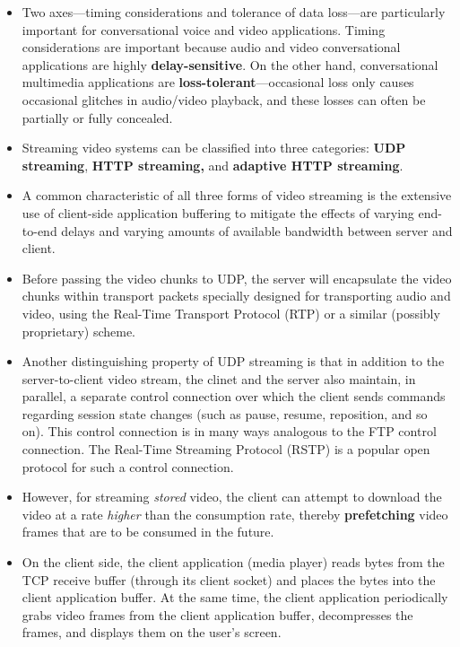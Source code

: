 \begin{itemize}
\item
Two axes---timing considerations and tolerance of data loss---are particularly important for conversational voice and video applications. Timing considerations are important because audio and video conversational applications are highly \textbf{delay-sensitive}. On the other hand, conversational multimedia applications are \textbf{loss-tolerant}---occasional loss only causes occasional glitches in audio/video playback, and these losses can often be partially or fully concealed.

\item
Streaming video systems can be classified into three categories: \textbf{UDP streaming}, \textbf{HTTP streaming,} and \textbf{adaptive HTTP streaming}.

\item
A common characteristic of all three forms of video streaming is the extensive use of client-side application buffering to mitigate the effects of varying end-to-end delays and varying amounts of available bandwidth between server and client.

\item
Before passing the video chunks to UDP, the server will encapsulate the video chunks within transport packets specially designed for transporting audio and video, using the Real-Time Transport Protocol (RTP) or a similar (possibly proprietary) scheme.

\item
Another distinguishing property of UDP streaming is that in addition to the server-to-client video stream, the clinet and the server also maintain, in parallel, a separate control connection over which the client sends commands regarding session state changes (such as pause, resume, reposition, and so on). This control connection is in many ways analogous to the FTP control connection. The Real-Time Streaming Protocol (RSTP) is a popular open protocol for such a control connection.

\item
However, for streaming \textit{stored} video, the client can attempt to download the video at a rate \textit{higher} than the consumption rate, thereby \textbf{prefetching} video frames that are to be consumed in the future.

\item
On the client side, the client application (media player) reads bytes from the TCP receive buffer (through its client socket) and places the bytes into the client application buffer. At the same time, the client application periodically grabs video frames from the client application buffer, decompresses the frames, and displays them on the user's screen.


\end{itemize}
